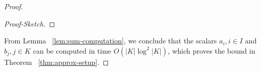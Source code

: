 \begin{proof}
\begin{proof}[Proof-Sketch]
	\end{proof}
    From Lemma ~\ref{lem:sum-computation}, we conclude that the scalars $a_i,i\in I$ and $b_j, j\in K$ can be computed in
    time $O(|K|\log^2 |K|)$, which proves the bound in Theorem ~\ref{thm:approx-setup}.

\end{proof}

